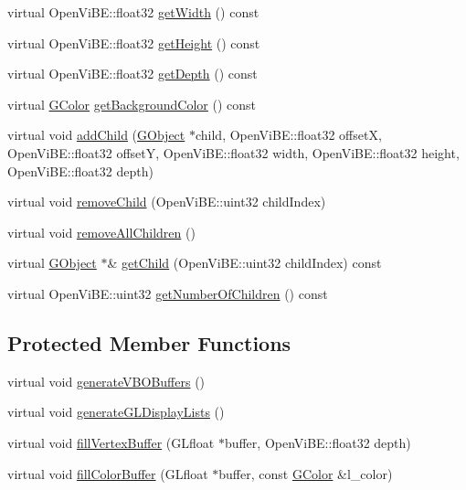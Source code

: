 \begin{DoxyCompactItemize}
\item 
virtual OpenViBE::float32 \hyperlink{classOpenViBEApplications_1_1GContainer_a5b891a71c06226ee798e674810aa0bc7}{getWidth} () const 
\item 
virtual OpenViBE::float32 \hyperlink{classOpenViBEApplications_1_1GContainer_a84c49520b6dc380e8d3c2baa9eaa2f3d}{getHeight} () const 
\item 
virtual OpenViBE::float32 \hyperlink{classOpenViBEApplications_1_1GContainer_a524a7292f29cd3c75673c816a2c6d9e7}{getDepth} () const 
\item 
virtual \hyperlink{structOpenViBEApplications_1_1GColor}{GColor} \hyperlink{classOpenViBEApplications_1_1GContainer_a42a93749391c407e730cc1fd35a80cc2}{getBackgroundColor} () const 
\item 
virtual void \hyperlink{classOpenViBEApplications_1_1GContainer_acc79c6a7cba3e04e2b936ebda77b7e31}{addChild} (\hyperlink{classOpenViBEApplications_1_1GObject}{GObject} $\ast$child, OpenViBE::float32 offsetX, OpenViBE::float32 offsetY, OpenViBE::float32 width, OpenViBE::float32 height, OpenViBE::float32 depth)
\item 
virtual void \hyperlink{classOpenViBEApplications_1_1GContainer_a3fc5ca080de023591f0479f595e299e8}{removeChild} (OpenViBE::uint32 childIndex)
\item 
virtual void \hyperlink{classOpenViBEApplications_1_1GContainer_abb919d6cafa36a99852b4cf0de11a4fe}{removeAllChildren} ()
\item 
virtual \hyperlink{classOpenViBEApplications_1_1GObject}{GObject} $\ast$\& \hyperlink{classOpenViBEApplications_1_1GContainer_adff0fc2d491889390ff5fbfef004eccd}{getChild} (OpenViBE::uint32 childIndex) const 
\item 
virtual OpenViBE::uint32 \hyperlink{classOpenViBEApplications_1_1GContainer_a70e7b586dcd873500856480903ab8d4d}{getNumberOfChildren} () const 
\end{DoxyCompactItemize}
\subsection*{Protected Member Functions}
\begin{DoxyCompactItemize}
\item 
virtual void \hyperlink{classOpenViBEApplications_1_1GContainer_a3031de20819a6b0afa00e3a3f53887ed}{generateVBOBuffers} ()
\item 
virtual void \hyperlink{classOpenViBEApplications_1_1GContainer_a9a6c96ef34077ec359f6d5416626c00a}{generateGLDisplayLists} ()
\item 
virtual void \hyperlink{classOpenViBEApplications_1_1GContainer_acf00005b2b5860c92046508838c0c0cb}{fillVertexBuffer} (GLfloat $\ast$buffer, OpenViBE::float32 depth)
\item 
virtual void \hyperlink{classOpenViBEApplications_1_1GContainer_aff2f31109d1ee2f8062a89a1539322fc}{fillColorBuffer} (GLfloat $\ast$buffer, const \hyperlink{structOpenViBEApplications_1_1GColor}{GColor} \&l\_\-color)
\end{DoxyCompactItemize}
